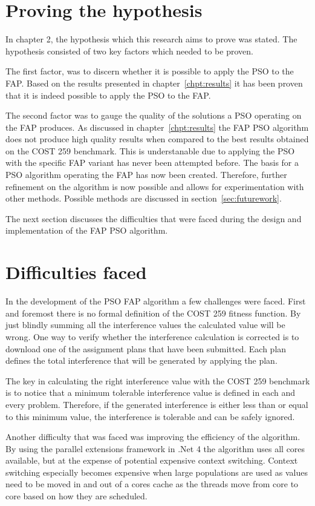 \section{Proving the hypothesis}
In chapter 2, the hypothesis which this research aims to prove was stated. The hypothesis consisted of two key factors which needed to be proven. 

The first factor, was to discern whether it is possible to apply the \gls{PSO} to the \gls{FAP}. Based on the results presented in chapter~\ref{chpt:results} it has been proven that it is indeed possible to apply the PSO to the FAP.

The second factor was to gauge the quality of the solutions a PSO operating on the FAP produces. As discussed in chapter~\ref{chpt:results} the FAP PSO algorithm does not produce high quality results when compared to the best results obtained on the COST 259 benchmark. This is understanable due to applying the PSO with the specific FAP variant has never been attempted before. The basis for a PSO algorithm operating the FAP has now been created. Therefore, further refinement on the algorithm is now possible and allows for experimentation with other methods. Possible methods are discussed in section~\ref{sec:futurework}.

The next section discusses the difficulties that were faced during the design and implementation of the FAP PSO algorithm. 
\section{Difficulties faced}
In the development of the PSO FAP algorithm a few challenges were faced. First and foremost there is no formal definition of the COST 259 fitness function. By just blindly summing all the interference values the calculated value will be wrong. One way to verify whether the interference calculation is corrected is to download one of the assignment plans that have been submitted. Each plan defines the total interference that will be generated by applying the plan. 

The key in calculating the right interference value with the COST 259 benchmark is to notice that a minimum tolerable interference value is defined in each and every problem. Therefore, if the generated interference is either less than or equal to this minimum value, the interference is tolerable and can be safely ignored.

Another difficulty that was faced was improving the efficiency of the algorithm. By using the parallel extensions framework in .Net 4 the algorithm uses all cores available, but at the expense of potential expensive context switching. Context switching especially becomes expensive when large populations are used as values need to be moved in and out of a cores cache as the threads move from core to core based on how they are scheduled.

